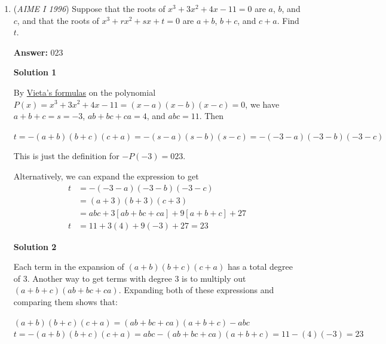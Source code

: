 \begin{enumerate}
 By similar triangles, $y = \frac {1}{x}$. The length of the complete side of the shadow base is $1+\frac {1}{x}$.

 The area of the shadow is $(1+\frac {1}{x})^2-1=48$.

 Solving this quadratic equation, continue as follows in Solution 1.

 
ANOTHER WAY is because we know 48 square cm is the area of the shadow, it must be the area of the larger square minus the area of the box, which is 1 square cm. So $(y+1)^2 - 1 = 48$ and $y = 6$.

 


	\item (\textit{AIME I 1996}) Suppose that the roots of $x^3+3x^2+4x-11=0$ are $a$, $b$, and $c$, and that the roots of $x^3+rx^2+sx+t=0$ are $a+b$, $b+c$, and $c+a$. Find $t$.


 
 \textbf{Answer: }023



\textbf{Solution 1}

By \href{https://artofproblemsolving.com/wiki/index.php?title=Vieta\%27s\_formulas}{Vieta's formulas} on the polynomial $P(x) = x^3+3x^2+4x-11 = (x-a)(x-b)(x-c) = 0$, we have $a + b + c = s = -3$, $ab + bc + ca = 4$, and $abc = 11$. Then

 $t = -(a+b)(b+c)(c+a) = -(s-a)(s-b)(s-c) = -(-3-a)(-3-b)(-3-c)$

 This is just the definition for $-P(-3) = \boxed{023}$.

 Alternatively, we can expand the expression to get
 \begin{align*} t &= -(-3-a)(-3-b)(-3-c)\\  &= (a+3)(b+3)(c+3)\\  &= abc + 3[ab + bc + ca] + 9[a + b + c] + 27\\ t &= 11 + 3(4) + 9(-3) + 27 = 23\end{align*}





\textbf{Solution  2}

Each term in the expansion of $(a+b)(b+c)(c+a)$ has a total degree of 3.  Another way to get terms with degree 3 is to multiply out $(a+b+c)(ab+bc+ca)$.  Expanding both of these expressions and comparing them shows that:

 $(a+b)(b+c)(c+a) = (ab+bc+ca)(a+b+c)-abc$$t = -(a+b)(b+c)(c+a) = abc-(ab+bc+ca)(a+b+c) = 11-(4)(-3) = 23$


\end{enumerate}
